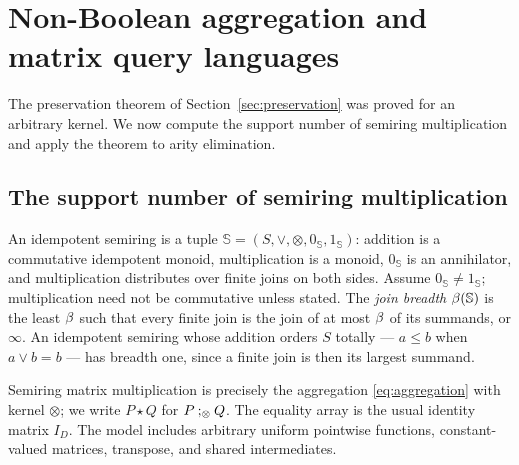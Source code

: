 \section{Non-Boolean aggregation and matrix query languages}\label{sec:matrix}
The preservation theorem of Section~\ref{sec:preservation} was proved for
an arbitrary kernel. We now compute the support number of semiring
multiplication and apply the theorem to arity elimination.

\subsection{The support number of semiring multiplication}\label{semi:width-section}
An idempotent semiring is a tuple
$\mathbb S=(S,\vee,\otimes,0_{\mathbb S},1_{\mathbb S})$: addition is a
commutative idempotent monoid, multiplication is a monoid, $0_{\mathbb S}$
is an annihilator, and multiplication distributes over finite joins on both
sides. Assume $0_{\mathbb S}\ne1_{\mathbb S}$; multiplication need not be
commutative unless stated. The \emph{join breadth}
$\beta(\mathbb S)$ is the least $\beta$ such that every finite join is
the join of at most $\beta$ of its summands, or $\infty$. An idempotent
semiring whose addition orders $S$ totally --- $a\le b$ when $a\vee b=b$ ---
has breadth one, since a finite join is then its largest summand.

Semiring matrix multiplication is precisely the aggregation
\eqref{eq:aggregation} with kernel $\otimes$; we write $P\star Q$ for
$P\mathbin{;_{\otimes}} Q$. The equality array is the usual identity matrix $I_D$. The
model includes arbitrary uniform pointwise functions, constant-valued
matrices, transpose, and shared intermediates.

